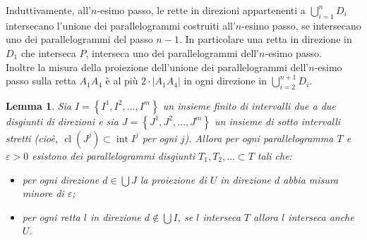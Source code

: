 \documentclass[a4paper, twoside,openright]{article}
\newcommand{\<}{\langle}
\renewcommand{\>}{\rangle}
\newtheorem{lemma}[teo]{Lemma}
\begin{document}
Induttivamente, all'$n$-esimo passo, le rette in direzioni appartenenti a $\bigcup_{i=1}^n D_i$ intersecano l'unione dei parallelogrammi costruiti all'$n$-esimo passo, se intersecano uno dei parallelogrammi del passo $n-1$. In particolare una retta in direzione in $D_1$ che interseca $P$, interseca uno dei parallelogrammi dell'$n$-esimo passo.\\
Inoltre la misura della proiezione dell'unione dei parallelogrammi dell'$n$-esimo passo sulla retta $A_{1} A_{4}$ è al più $2 \cdot\left|A_{1} A_{4}\right|$ in ogni direzione in $\bigcup_{i=2}^{n+1}D_i$.\\

\begin{lemma} \label{altroarticolo}
	Sia $I=\left\{I^{1}, I^{2}, \ldots, I^{m}\right\}$ un insieme finito di intervalli due a due disgiunti di direzioni e sia $J=\left\{J^{1}, J^{2}, \ldots, J^{m}\right\}$ un insieme di sotto intervalli stretti (cioè, $\operatorname{cl}\left(J^{j}\right) \subset \operatorname{int} I^{j}$ per ogni $j$). Allora per ogni parallelogramma $T$ e $\varepsilon>0$ esistono dei parallelogrammi disgiunti $T_{1}, T_{2}, \ldots \subset T$ tali che:
	
	\begin{itemize}
		\item per ogni direzione $d \in \bigcup J$ la proiezione di $U$ in direzione $d$ abbia misura minore di $\varepsilon$;
		\item per ogni retta $l$ in direzione $d \notin \bigcup I$, se $l$ interseca $T$ allora $l$ interseca anche $U$.	
	\end{itemize}
\end{lemma}	
\end{document}
